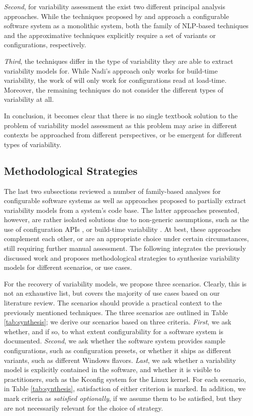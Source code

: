 \emph{Second}, for variability assessment the exist two different principal
analysis approaches. While the techniques proposed by \cite{nadi_mining_2014,nadi_where_2015}
and \cite{rabkin_static_2011} approach a configurable software system as a monolithic system,
both the family of NLP-based techniques and the approximative techniques
\cite{lopez-herrejon_reverse_2012,lopez-herrejon_assessment_2015,linsbauer_feature_2014}
explicitly require a set of variants or configurations, respectively.

\emph{Third}, the techniques differ in the type of variability they are able to
extract variability models for. While Nadi’s approach only works for build-time
variability, the work of \cite{rabkin_static_2011} will only work for configurations read at
load-time. Moreover, the remaining techniques do not consider the different types of
variability at all.

In conclusion, it becomes clear that there is no single textbook solution to
the problem of variability model assessment as this problem may arise in
different contexts be approached from different perspectives, or be emergent
for different types of variability.

\subsection{Methodological Strategies}
The last two subsections reviewed a number of family-based analyses for
configurable software systems as well as approaches proposed to partially
extract variability models from a system’s code base. The latter approaches
presented, however, are rather isolated solutions due to non-generic
assumptions, such as the use of configuration APIs \citep{rabkin_static_2011},
or build-time variability \citep{nadi_where_2015}. At best, these approaches
complement each other, or are an appropriate choice under certain
circumstances, still requiring further manual assessment. The following
integrates the previously discussed work and proposes methodological strategies
to synthesize variability models for different scenarios, or use cases.

For the recovery of variability models, we propose three scenarios. Clearly,
this is not an exhaustive list, but covers the majority of use cases based on
our literature review. The scenarios should provide a practical context to the
previously mentioned techniques. The three scenarios are outlined in Table
\ref{tab:synthesis}; we derive our scenarios based on three criteria.
\emph{First}, we ask whether, and if so, to what extent configurability for a
software system is documented. \emph{Second}, we ask whether the software
system provides sample configurations, such as configuration presets, or
whether it ships as different variants, such as different Windows flavors.
\emph{Last}, we ask whether a variability model is explicitly contained in the
software, and whether it is visible to practitioners, such as the Kconfig
system for the Linux kernel. For each scenario, in Table \ref{tab:synthesis},
satisfaction of either criterion is marked. In addition, we mark criteria as
\emph{satisfied optionally}, if we assume them to be satisfied, but they are
not necessarily relevant for the choice of strategy.

